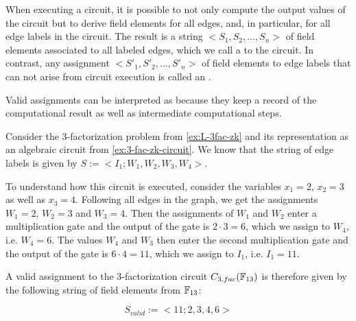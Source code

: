 When executing a circuit, it is possible to not only compute the output values of the circuit but to derive field elements for all edges, and, in particular, for all edge labels in the circuit. The result is a string $<S_1,S_2,\ldots, S_n>$ of field elements associated to all labeled edges, which we call a  to the circuit. In contrast, any assignment $<S'_1,S'_2,\ldots, S'_n>$ of field elements to edge labels that can not arise from circuit execution is called an .

Valid assignments can be interpreted as  because they keep a record of the computational result as well as intermediate computational steps. 
\begin{example}[3-factorization]
\label{ex:3-fac-zk-circuit_2}
Consider the $3$-factorization problem from \examplename{} \ref{ex:L-3fac-zk} and its representation as an algebraic circuit from \examplename{} \ref{ex:3-fac-zk-circuit}. We know that the string of edge labels is given by $S:=<I_{1};W_{1},W_{2},W_{3}, W_{4}>$. 

To understand how this circuit is executed, consider the variables $x_1=2$, $x_2=3$ as well as $x_3=4$. Following all edges in the graph, we get the assignments $W_1=2$, $W_2=3$ and $W_3=4$. Then the assignments of $W_1$ and $W_2$ enter a multiplication gate and the output of the gate is $2\cdot 3 = 6$, which we assign to $W_4$, i.e. $W_4=6$. The values $W_4$ and $W_3$ then enter the second multiplication gate and the output of the gate is $6\cdot 4 = 11$, which we assign to $I_1$, i.e. $I_1=11$. 

A valid assignment to the 3-factorization circuit $C_{3.fac}(\mathbb{F}_{13})$ is therefore given by the following string of field elements from $\mathbb{F}_{13}$:

\begin{equation}\label{C3fac}
S_{valid}:=<11;2,3,4,6>
\end{equation}


\end{example}
